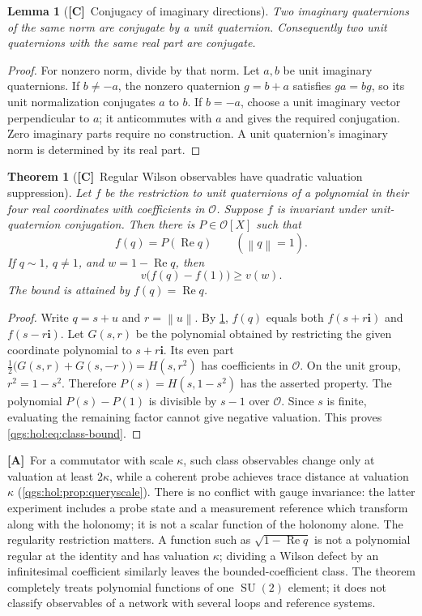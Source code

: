 \documentclass[11pt,oneside]{article}
\numberwithin{equation}{section}
\theoremstyle{plain}
\newtheorem{theorem}{Theorem}[section]
\newtheorem{lemma}[lemma]{Lemma}
\theoremstyle{definition}
\theoremstyle{remark}
\newcommand{\OO}{\mathcal O}
\newcommand{\qi}{\mathbf i}
\DeclareMathOperator{\Rea}{Re}
\DeclareMathOperator{\SU}{SU}
\newcommand{\norm}[1]{\left\|#1\right\|}
\newcommand{\TC}{\textcolor{TierC}{\textsf{\bfseries[C]}}}
\newcommand{\TA}{\textcolor{TierA}{\textsf{\bfseries[A]}}}
\begin{document}
\begin{lemma}[\TC\ Conjugacy of imaginary directions]\label{qgs:hol:lem:conjugacy}
Two imaginary quaternions of the same norm are conjugate by a unit quaternion. Consequently two unit quaternions with the same real part are conjugate.
\end{lemma}
\begin{proof}
For nonzero norm, divide by that norm. Let $a,b$ be unit imaginary quaternions. If $b\neq-a$, the nonzero quaternion $g=b+a$ satisfies $ga=bg$, so its unit normalization conjugates $a$ to $b$. If $b=-a$, choose a unit imaginary vector perpendicular to $a$; it anticommutes with $a$ and gives the required conjugation. Zero imaginary parts require no construction. A unit quaternion's imaginary norm is determined by its real part.
\end{proof}

\begin{theorem}[\TC\ Regular Wilson observables have quadratic valuation suppression]\label{qgs:hol:thm:classfunctions}
Let $f$ be the restriction to unit quaternions of a polynomial in their four real coordinates with coefficients in $\OO$. Suppose $f$ is invariant under unit-quaternion conjugation. Then there is $P\in\OO[X]$ such that
\[
 f(q)=P(\Rea q)\qquad(\norm q=1).
\]
If $q\sim1$, $q\neq1$, and $w=1-\Rea q$, then
\begin{equation}\label{qgs:hol:eq:class-bound}
 v\bigl(f(q)-f(1)\bigr)\geq v(w).
\end{equation}
The bound is attained by $f(q)=\Rea q$.
\end{theorem}
\begin{proof}
Write $q=s+u$ and $r=\norm u$. By \cref{qgs:hol:lem:conjugacy}, $f(q)$ equals both $f(s+r\qi)$ and $f(s-r\qi)$. Let $G(s,r)$ be the polynomial obtained by restricting the given coordinate polynomial to $s+r\qi$. Its even part $\tfrac12\bigl(G(s,r)+G(s,-r)\bigr)=H(s,r^2)$ has coefficients in $\OO$. On the unit group, $r^2=1-s^2$. Therefore $P(s)=H(s,1-s^2)$ has the asserted property. The polynomial $P(s)-P(1)$ is divisible by $s-1$ over $\OO$. Since $s$ is finite, evaluating the remaining factor cannot give negative valuation. This proves \eqref{qgs:hol:eq:class-bound}.
\end{proof}

\TA\ For a commutator with scale $\kappa$, such class observables change only at valuation at least $2\kappa$, while a coherent probe achieves trace distance at valuation $\kappa$ (\cref{qgs:hol:prop:queryscale}). There is no conflict with gauge invariance: the latter experiment includes a probe state and a measurement reference which transform along with the holonomy; it is not a scalar function of the holonomy alone. The regularity restriction matters. A function such as $\sqrt{1-\Rea q}$ is not a polynomial regular at the identity and has valuation $\kappa$; dividing a Wilson defect by an infinitesimal coefficient similarly leaves the bounded-coefficient class. The theorem completely treats polynomial functions of one $\SU(2)$ element; it does not classify observables of a network with several loops and reference systems.
\end{document}
